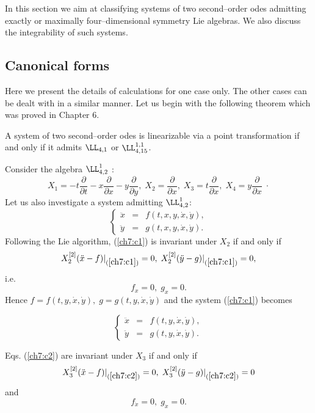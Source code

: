 In this section we aim at classifying systems of two second--order odes
admitting exactly or maximally four--dimensional symmetry Lie algebras. We
also discuss the integrability of such systems. 

\subsection{Canonical forms} 

Here we present the details
of calculations for one case only. The other cases can be dealt with
in a similar manner. Let us begin with the following theorem which was proved in
Chapter 6.

\begin{theo}
\label{ch7:th1}
\begin{em}
A system of two second--order odes is linearizable via a
point transformation if and only if it admits $\LL_{4,1}$ or
$\LL_{4,15}^{1,1}$.
\end{em}
\end{theo}
Consider the algebra $\LL_{4,2}^1$ : \[
X_1=-t\frac{\partial}{\partial t}- x\frac{\partial}{\partial x}
-y\frac{\partial}{\partial y} , \; X_2= \frac{\partial}{\partial x},\;
X_3=t\frac{\partial}{\partial x},\;  X_4=y\frac{\partial}{\partial x}\;\cdot \]
Let us also investigate a system admitting $\LL_{4,2}^1$: \begin{equation}
\label{ch7:c1} \left \{ \begin{array}{lll} \ddot x &= & f(t,x,y,\dot x,\dot
y),\\ \ddot y &= & g(t,x,y,\dot x,\dot y). \end{array} \right.
\end{equation} Following the Lie algorithm, (\ref{ch7:c1})
is invariant under $X_2$ if and only if \[X_2^{[2]}(\ddot
x-f)|_{(\ref{ch7:c1})}=0,\; X_2^{[2]}(\ddot y-g)|_{(\ref{ch7:c1})}=0, \] i.e.
\[f_x=0,\;g_x=0.\] Hence $f=f(t,y,\dot x,\dot y),\; g=g(t,y,\dot x,\dot
y)$ and the system (\ref{ch7:c1}) becomes

\begin{equation}
\label{ch7:c2}
\left \{ \begin{array}{lll}
\ddot x &= & f(t,y,\dot x,\dot y),\\
\ddot y &= & g(t,y,\dot x,\dot y).
\end{array} \right.
\end{equation}

Eqs. (\ref{ch7:c2}) are invariant under
$X_3$ if and only if
\[X_3^{[2]}(\ddot x-f)|_{(\ref{ch7:c2})}=0,\; 
X_3^{[2]}(\ddot y-g)|_{(\ref{ch7:c2})}=0 \]
and
\[f_{\dot x}=0,\;g_{\dot x}=0.\]

